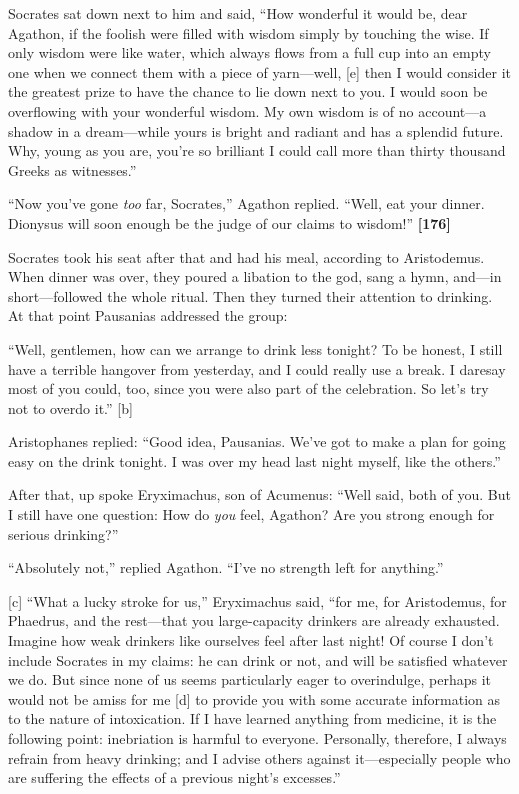 Socrates sat down next to him and said, “How wonderful it would be, dear
Agathon, if the foolish were filled with wisdom simply by touching the
wise. If only wisdom were like water, which always flows from a full cup
into an empty one when we connect them with a piece of yarn---well,
{[}e{]} then I would consider it the greatest prize to have the chance
to lie down next to you. I would soon be overflowing with your wonderful
wisdom. My own wisdom is of no account---a shadow in a dream---while
yours is bright and radiant and has a splendid future. Why, young as you
are, you're so brilliant I could call more than thirty thousand Greeks
as witnesses.”

“Now you've gone {\em too} far, Socrates,” Agathon replied. “Well, eat
your dinner. Dionysus will soon enough be the judge of our claims to
wisdom!”
{\bf {[}176{]}}

Socrates took his seat after that and had his meal, according to
Aristodemus. When dinner was over, they poured a libation to the god,
sang a hymn, and---in short---followed the whole ritual. Then they
turned their attention to drinking. At that point Pausanias addressed
the group:

“Well, gentlemen, how can we arrange to drink less tonight? To be
honest, I still have a terrible hangover from yesterday, and I could
really use a break. I daresay most of you could, too, since you were
also part of the celebration. So let's try not to overdo it.” {[}b{]}

Aristophanes replied: “Good idea, Pausanias. We've got to make a plan
for going easy on the drink tonight. I was over my head last night
myself, like the others.”

After that, up spoke Eryximachus, son of Acumenus: “Well said, both of
you. But I still have one question: How do {\em you} feel, Agathon? Are
you strong enough for serious drinking?”

“Absolutely not,” replied Agathon. “I've no strength left for anything.”

{[}c{]} “What a lucky stroke for us,” Eryximachus said, “for me, for
Aristodemus, for Phaedrus, and the rest---that you large-capacity
drinkers are already exhausted. Imagine how weak drinkers like ourselves
feel after last night! Of course I don't include Socrates in my claims:
he can drink or not, and will be satisfied whatever we do. But since
none of us seems particularly eager to overindulge, perhaps it would not
be amiss for me {[}d{]} to provide you with some accurate information as
to the nature of intoxication. If I have learned anything from medicine,
it is the following point: inebriation is harmful to everyone.
Personally, therefore, I always refrain from heavy drinking; and I
advise others against it---especially people who are suffering the
effects of a previous night's excesses.”

